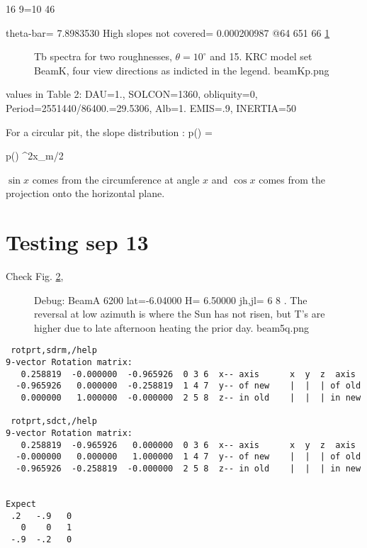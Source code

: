 \documentclass{article}
\begin{document}
16 9=10 46 

theta-bar=       7.8983530
High slopes not covered=  0.000200987
@64 651 66
\ref{beamKp}
\begin{figure}[!ht] 
\caption[Two slopes]{Tb spectra for two roughnesses, $\theta = 10^\circ$ and 15\qd. KRC model set BeamK, four view directions as indicted in the legend.
\label{beamKp}  beamKp.png  }
\end{figure} 

  values in Table 2: DAU=1., SOLCON=1360, obliquity=0, Period=2551440/86400.=29.5306, Alb=1. EMIS=.9, INERTIA=50

For a circular pit, the slope distribution :
\qbn  p(\theta) =  \qen

\qbn  p(\theta)  {\sin^2x_m/2} \qen

$\sin x$ comes from the circumference at angle $x$ and  $\cos x$ comes from the projection onto the horizontal plane.

\section{Testing sep 13}

Check Fig. \ref{beam5q}, 
\begin{figure}[!ht] 
\caption[Ts vrs azimuth]{Debug: BeamA 6200 lat=-6.04000 H= 6.50000 jh,jl= 6 8 .
  The reversal at low azimuth is where the Sun has not risen, but T's are higher
  due to late afternoon heating the prior day.
\label{beam5q}  beam5q.png }
\end{figure} 

\begin{verbatim}
 rotprt,sdrm,/help
9-vector Rotation matrix:  
   0.258819  -0.000000  -0.965926  0 3 6  x-- axis      x  y  z  axis
  -0.965926   0.000000  -0.258819  1 4 7  y-- of new    |  |  | of old
   0.000000   1.000000  -0.000000  2 5 8  z-- in old    |  |  | in new

 rotprt,sdct,/help
9-vector Rotation matrix:  
   0.258819  -0.965926   0.000000  0 3 6  x-- axis      x  y  z  axis
  -0.000000   0.000000   1.000000  1 4 7  y-- of new    |  |  | of old
  -0.965926  -0.258819  -0.000000  2 5 8  z-- in old    |  |  | in new


Expect      
 .2   -.9   0    
   0    0   1 
 -.9  -.2   0

\end{verbatim} 
\end{document}
